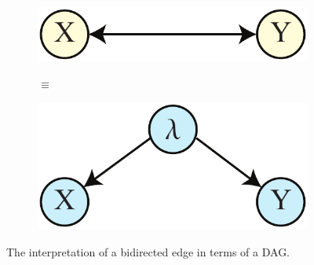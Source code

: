 \documentclass[12pt,onecolumn,nofootinbib]{revtex4-2}
\begin{document}
\begin{figure}[h]
        \begin{subfigure}[b]{0.2\textwidth}
                	\centering
                	\includegraphics[width=\textwidth]{XY-darrow}
                	\label{fig:XY-darrow}
        \end{subfigure}
                      \begin{subfigure}[b]{0.05\textwidth}
                	\centering
                	$\equiv$\vspace{2em}
        \end{subfigure}
        \begin{subfigure}[b]{0.2\textwidth}
                	\centering
                	\includegraphics[width=\textwidth]{XY-hvar}
                	\label{fig:XY-hvar}
        \end{subfigure}
        \caption{The interpretation of a bidirected edge in terms of a DAG.}
        \label{fig:XY-latentcause}
\end{figure}
\end{document}
